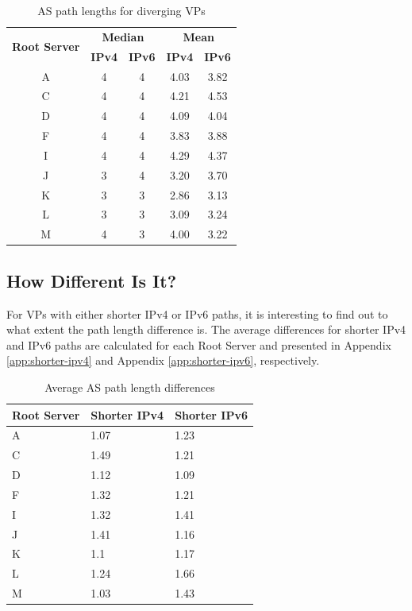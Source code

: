 \begin{table}[!ht]
	\centering
	\begin{tabular}{c c c c c}
		\hline
		\multirow{2}{*}{\textbf{Root Server}} & \multicolumn{2}{c}{\textbf{Median}} & \multicolumn{2}{c}{\textbf{Mean}} \\
		& \textbf{IPv4} & \textbf{IPv6} & \textbf{IPv4} & \textbf{IPv6} \\
		\hline\hline
		A			& 4 & 4 & 4.03	& 3.82 \\ \hline
		C			& 4 & 4 & 4.21	& 4.53 \\ \hline
		D			& 4 & 4 & 4.09	& 4.04 \\ \hline
		F			& 4 & 4 & 3.83	& 3.88 \\ \hline
		I			& 4 & 4 & 4.29	& 4.37 \\ \hline
		J			& 3 & 4 & 3.20	& 3.70 \\ \hline
		K			& 3 & 3 & 2.86	& 3.13 \\ \hline
		L			& 3 & 3 & 3.09	& 3.24 \\ \hline
		M			& 4 & 3 & 4.00	& 3.22 \\ \hline
	\end{tabular}
	\caption{AS path lengths for diverging VPs}
	\label{table:ch04:path-length-average-diff}
\end{table}

\subsection{How Different Is It?}
\label{ch04:diff:diff-how-diff}
For VPs with either shorter IPv4 or IPv6 paths, it is interesting to find out to what extent the path length difference is. The average differences for shorter IPv4 and IPv6 paths are calculated for each Root Server and presented in Appendix \ref{app:shorter-ipv4} and Appendix \ref{app:shorter-ipv6}, respectively. 

\begin{table}
	\centering
	\begin{tabular}{C{3cm}  C{3cm} C{3cm} }
		\hline
		\textbf{Root Server} & \textbf{Shorter IPv4}	& \textbf{Shorter IPv6}  \\ \hline\hline
		A	& 1.07	& 1.23 \\ \hline
		C	& 1.49	& 1.21 \\ \hline
		D	& 1.12	& 1.09	\\ \hline
		F	& 1.32	& 1.21  \\ \hline
		I	& 1.32	& 1.41 \\ \hline
		J	& 1.41	& 1.16	\\ \hline
		K	& 1.1	& 1.17 \\ \hline
		L	& 1.24	& 1.66	\\ \hline
		M	& 1.03	& 1.43	\\ \hline
	\end{tabular}
	\caption{Average AS path length differences}
	\label{table:ch04:avg_path_diff}
\end{table}

